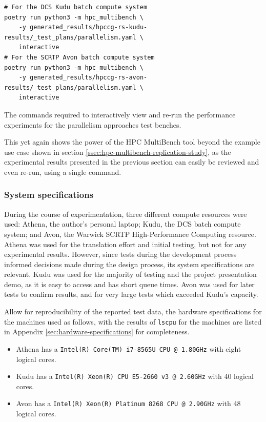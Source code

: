 \begin{listing}[H]
    \begin{verbatim}
# For the DCS Kudu batch compute system
poetry run python3 -m hpc_multibench \
    -y generated_results/hpccg-rs-kudu-results/_test_plans/parallelism.yaml \
    interactive
# For the SCRTP Avon batch compute system
poetry run python3 -m hpc_multibench \
    -y generated_results/hpccg-rs-avon-results/_test_plans/parallelism.yaml \
    interactive
    \end{verbatim}
    \caption{The commands required to interactively view and re-run the performance experiments for the parallelism approaches test benches.}
    \label{listing:serial-data-interactive}
\end{listing}

This yet again shows the power of the HPC MultiBench tool beyond the example use case shown in section \ref{ssec:hpc-multibench-replication-study}, as the experimental results presented in the previous section can easily be reviewed and even re-run, using a single command.


\subsubsection{System specifications}
\label{sssec:system-specifications}

During the course of experimentation, three different compute resources were used: Athena, the author's personal laptop; Kudu, the DCS batch compute system; and Avon, the Warwick SCRTP High-Performance Computing resource. Athena was used for the translation effort and initial testing, but not for any experimental results. However, since tests during the development process informed decisions made during the design process, its system specifications are relevant. Kudu was used for the majority of testing and the project presentation demo, as it is easy to access and has short queue times. Avon was used for later tests to confirm results, and for very large tests which exceeded Kudu's capacity.

Allow for reproducibility of the reported test data, the hardware specifications for the machines used as follows, with the results of \texttt{lscpu} for the machines are listed in Appendix \ref{sec:hardware-specifications} for completeness.

\begin{itemize}
    \item Athena has a \texttt{Intel(R) Core(TM) i7-8565U CPU @ 1.80GHz} with eight logical cores.
    \item Kudu has a \texttt{Intel(R) Xeon(R) CPU E5-2660 v3 @ 2.60GHz} with 40 logical cores.
    \item Avon has a \texttt{Intel(R) Xeon(R) Platinum 8268 CPU @ 2.90GHz} with 48 logical cores.
\end{itemize}

